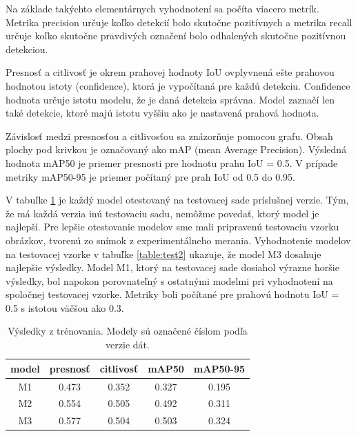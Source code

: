 Na základe takýchto elementárnych vyhodnotení sa počíta viacero metrík. Metrika precision určuje koľko detekcií bolo skutočne pozitívnych a metrika recall určuje koľko skutočne pravdivých označení bolo odhalených skutočne pozitívnou detekciou.

%
%

Presnosť a citlivosť je okrem prahovej hodnoty IoU ovplyvnená ešte prahovou hodnotou istoty (confidence), ktorá je vypočítaná pre každú detekciu. Confidence hodnota určuje istotu modelu, že je daná detekcia správna. Model zaznačí len také detekcie, ktoré majú istotu vyššiu ako je nastavená prahová hodnota.

Závislosť medzi presnosťou a citlivosťou sa znázorňuje pomocou grafu. Obsah plochy pod krivkou je označovaný ako mAP (mean Average Precision). Výsledná hodnota mAP50 je priemer presnosti pre hodnotu prahu IoU = 0.5. V prípade metriky mAP50-95 je priemer počítaný pre prah IoU od 0.5 do 0.95.

V tabuľke \ref{table:test1} je každý model otestovaný na testovacej sade príslušnej verzie. Tým, že má každá verzia inú testovaciu sadu, nemôžme povedať, ktorý model je najlepší. Pre lepšie otestovanie modelov sme mali pripravenú testovaciu vzorku obrázkov, tvorenú zo snímok z experimentálneho merania. Vyhodnotenie modelov na testovacej vzorke v tabuľke \ref{table:test2} ukazuje, že model M3 dosahuje najlepšie výsledky. Model M1, ktorý na testovacej sade dosiahol výrazne horšie výsledky, bol napokon porovnateľný s ostatnými modelmi pri vyhodnotení na spoločnej testovacej vzorke. Metriky boli počítané pre prahovú hodnotu IoU = 0.5 s istotou väčšou ako 0.3.

\newpage

\begin{table}[ht]
\centering
\begin{tabular}{ |c c c c c| }
\hline
model & presnosť & citlivosť & mAP50 & mAP50-95 \\
\hline
M1  & 0.473 & 0.352	& 0.327	& 0.195 \\
M2  & 0.554	& 0.505	& 0.492	& 0.311 \\
M3  & 0.577	& 0.504	& 0.503	& 0.324 \\
\hline
\end{tabular}
\caption{Výsledky z trénovania. Modely sú označené číslom podľa verzie dát.}
\label{table:test1}
\end{table}

